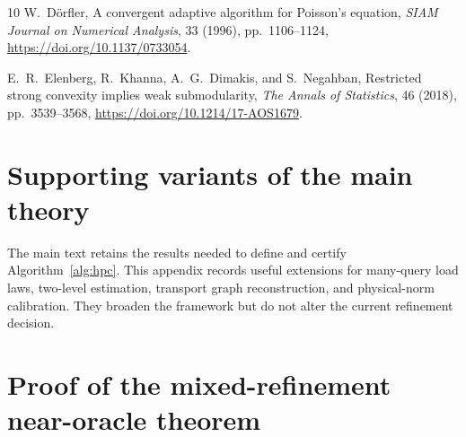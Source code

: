 \documentclass[11pt]{article}
\numberwithin{algorithm}{section}
\theoremstyle{definition}\newtheorem{definition}[theorem]{Definition}
\theoremstyle{remark}\newtheorem{remark}[theorem]{Remark}
\begin{document}
\begin{thebibliography}{10}
W.~D\"orfler,
\newblock A convergent adaptive algorithm for Poisson's equation,
\newblock \emph{SIAM Journal on Numerical Analysis}, 33 (1996),
pp.~1106--1124,
\newblock \url{https://doi.org/10.1137/0733054}.

E.~R.~Elenberg, R.~Khanna, A.~G.~Dimakis, and S.~Negahban,
\newblock Restricted strong convexity implies weak submodularity,
\newblock \emph{The Annals of Statistics}, 46 (2018), pp.~3539--3568,
\newblock \url{https://doi.org/10.1214/17-AOS1679}.
\end{thebibliography}

\appendix
{}
\section{Supporting variants of the main theory}
\label{app:secondary-theory}
The main text retains the results needed to define and certify
Algorithm~\ref{alg:hpc}.  This appendix records useful extensions for
many-query load laws, two-level estimation, transport graph reconstruction,
and physical-norm calibration.  They broaden the framework but do not alter
the current refinement decision.
\storedtheoryA

\section{Proof of the mixed-refinement near-oracle theorem}
\label{app:mixed-near-oracle-proof}
\end{document}
